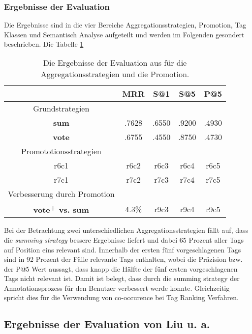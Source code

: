 
\subsubsection{Ergebnisse der Evaluation} %
\label{ssub:ergebnisse_der_evaluation}

Die Ergebnisse sind in die vier Bereiche Aggregationsstrategien, Promotion, Tag Klassen und Semantisch Analyse aufgeteilt und werden im Folgenden gesondert beschrieben. Die Tabelle \ref{tab:strategiesrResultsBjoern}

\begin{table}[htbp]
  \centering
  \begin{tabular}{ccccc}
  \hline
   & \textbf{MRR} & \textbf{S@1} & \textbf{S@5} & \textbf{P@5}\\
  \hline
  Grundstrategien\\
  \textbf{sum} & .7628 & .6550 & .9200 & .4930\\
  \textbf{vote} & .6755 & .4550 & .8750 & .4730\\
  \hline
  Promototionsstrategien\\
  r6c1 & r6c2 & r6c3 & r6c4 & r6c5\\
  r7c1 & r7c2 & r7c3 & r7c4 & r7c5\\
  \hline
  Verbesserung durch Promotion\\
  \textbf{vote\textsuperscript{+} vs. sum} & 4.3\% & r9c3 & r9c4 & r9c5\\
  \hline
  \end{tabular}
  \caption{Die Ergebnisse der Evaluation aus \cite{collectiveKnowledge} für die Aggregationsstrategien und die Promotion.}
  \label{tab:strategiesrResultsBjoern}
\end{table}

Bei der Betrachtung zwei unterschiedlichen Aggregationsstrategien fällt auf, dass die \emph{summing strategy} bessere Ergebnisse liefert und dabei 65 Prozent aller Tags auf Position eins relevant sind. Innerhalb der ersten fünf vorgeschlagenen Tags sind in 92 Prozent der Fälle relevante Tags enthalten, wobei die Präzision bzw. der P@5 Wert aussagt, dass knapp die Hälfte der fünf ersten vorgeschlagenen Tags nicht relevant ist. Damit ist belegt, dass durch die summing strategy der Annotationsprozess für den Benutzer verbessert werde konnte. Gleichzeitig spricht dies für die Verwendung von co-occurence bei Tag Ranking Verfahren.






\subsection{Ergebnisse der Evaluation von Liu u. a.} %
\label{sub:ergebnisse_der_evaluation_von_}


